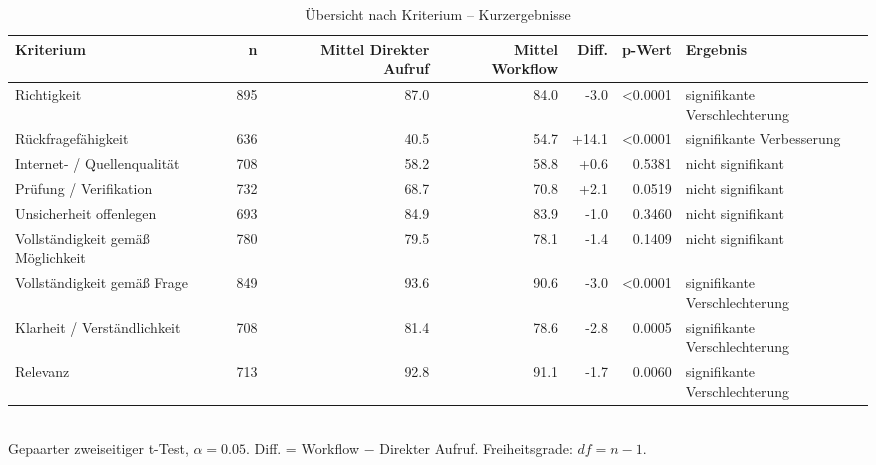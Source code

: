 \begin{table}[htbp]
\centering
\caption{Übersicht nach Kriterium -- Kurzergebnisse}
\begin{tabular}{lrrrrrl}
\toprule
Kriterium & n & Mittel Direkter Aufruf & Mittel Workflow & Diff. & p-Wert & Ergebnis \\
\midrule
Richtigkeit & 895 & 87.0 & 84.0 & -3.0 & <0.0001 & signifikante Verschlechterung \\
Rückfragefähigkeit & 636 & 40.5 & 54.7 & +14.1 & <0.0001 & signifikante Verbesserung \\
Internet- / Quellenqualität & 708 & 58.2 & 58.8 & +0.6 & 0.5381 & nicht signifikant \\
Prüfung / Verifikation & 732 & 68.7 & 70.8 & +2.1 & 0.0519 & nicht signifikant \\
Unsicherheit offenlegen & 693 & 84.9 & 83.9 & -1.0 & 0.3460 & nicht signifikant \\
Vollständigkeit gemäß Möglichkeit & 780 & 79.5 & 78.1 & -1.4 & 0.1409 & nicht signifikant \\
Vollständigkeit gemäß Frage & 849 & 93.6 & 90.6 & -3.0 & <0.0001 & signifikante Verschlechterung \\
Klarheit / Verständlichkeit & 708 & 81.4 & 78.6 & -2.8 & 0.0005 & signifikante Verschlechterung \\
Relevanz & 713 & 92.8 & 91.1 & -1.7 & 0.0060 & signifikante Verschlechterung \\
\bottomrule
\end{tabular}
\\[2mm]
\footnotesize Gepaarter zweiseitiger t-Test, $\alpha=0.05$. Diff. = Workflow $-$ Direkter Aufruf. Freiheitsgrade: $df=n-1$.
\end{table}
